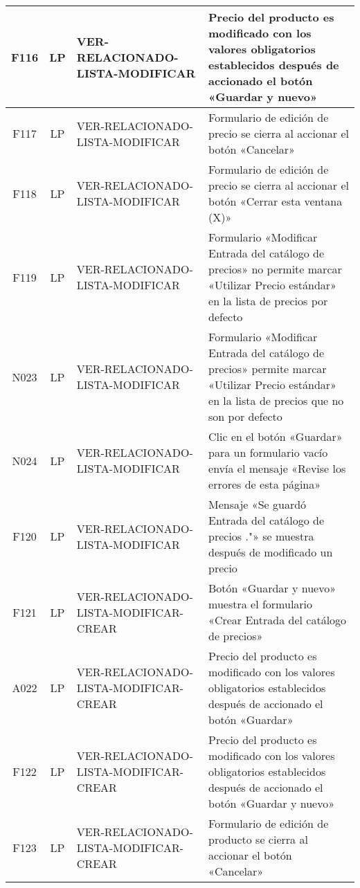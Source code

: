 \begin{landscape}
{\begin{longtable}[htb]{|c|c|p{3.8cm}|p{15.2cm}|}
\scriptsize{F116} & \scriptsize{LP} & \scriptsize{VER-RELACIONADO-LISTA-MODIFICAR} & \scriptsize{Precio del producto es modificado con los valores obligatorios establecidos después de accionado el botón «Guardar y nuevo»} \\ \hline
\scriptsize{F117} & \scriptsize{LP} & \scriptsize{VER-RELACIONADO-LISTA-MODIFICAR} & \scriptsize{Formulario de edición de precio se cierra al accionar el botón «Cancelar»} \\ \hline
\scriptsize{F118} & \scriptsize{LP} & \scriptsize{VER-RELACIONADO-LISTA-MODIFICAR} & \scriptsize{Formulario de edición de precio se cierra al accionar el botón «Cerrar esta ventana (X)»} \\ \hline
\scriptsize{F119} & \scriptsize{LP} & \scriptsize{VER-RELACIONADO-LISTA-MODIFICAR} & \scriptsize{Formulario «Modificar Entrada del catálogo de precios» no permite marcar «Utilizar Precio estándar» en la lista de precios por defecto} \\ \hline
\scriptsize{N023} & \scriptsize{LP} & \scriptsize{VER-RELACIONADO-LISTA-MODIFICAR} & \scriptsize{Formulario «Modificar Entrada del catálogo de precios» permite marcar «Utilizar Precio estándar» en la lista de precios que no son por defecto} \\ \hline
\scriptsize{N024} & \scriptsize{LP} & \scriptsize{VER-RELACIONADO-LISTA-MODIFICAR} & \scriptsize{Clic en el botón «Guardar» para un formulario vacío envía el mensaje «Revise los errores de esta página»} \\ \hline
\scriptsize{F120} & \scriptsize{LP} & \scriptsize{VER-RELACIONADO-LISTA-MODIFICAR} & \scriptsize{Mensaje «Se guardó Entrada del catálogo de precios ."» se muestra después de modificado un precio} \\ \hline
\scriptsize{F121} & \scriptsize{LP} & \scriptsize{VER-RELACIONADO-LISTA-MODIFICAR-CREAR} & \scriptsize{Botón «Guardar y nuevo» muestra el formulario «Crear Entrada del catálogo de precios»} \\ \hline
\scriptsize{A022} & \scriptsize{LP} & \scriptsize{VER-RELACIONADO-LISTA-MODIFICAR-CREAR} & \scriptsize{Precio del producto es modificado con los valores obligatorios establecidos después de accionado el botón «Guardar»} \\ \hline
\scriptsize{F122} & \scriptsize{LP} & \scriptsize{VER-RELACIONADO-LISTA-MODIFICAR-CREAR} & \scriptsize{Precio del producto es modificado con los valores obligatorios establecidos después de accionado el botón «Guardar y nuevo»} \\ \hline
\scriptsize{F123} & \scriptsize{LP} & \scriptsize{VER-RELACIONADO-LISTA-MODIFICAR-CREAR} & \scriptsize{Formulario de edición de producto se cierra al accionar el botón «Cancelar»} \\ \hline

\end{longtable}}
\end{landscape}

